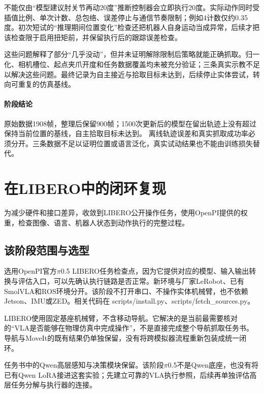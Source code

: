 不能仅由``模型建议肘关节再动20度''推断控制器会立即执行20度。实际动作同时受插值比例、单次计数、总包络、误差停止与通信节奏限制；例如4计数仅约0.35度。初次短试的``推理期间位置变化''检查还把机器人自身运动当成异常，后续才把该检查限于启用扭矩前，并保留执行后的跟踪误差检查。

这些问题解释了部分``几乎没动''，但并未证明解除限制后策略就能正确抓取。归一化、相机槽位、起点夹爪开度和任务数据覆盖均未被充分验证；三条真实示教不足以解决这些问题。最终记录为自主接近与拾取目标未达到，后续停止实体尝试，转向可重复的仿真基线。


\paragraph{阶段结论}原始数据1908帧，整理后保留900帧；1500次更新后的模型在留出轨迹上没有超过保持当前位置的基线，自主拾取目标未达到。 离线轨迹误差和真实抓取成功率必须分开。三条数据不足以证明位置或语言泛化，真实试动结果也不能由训练损失替代。


\FloatBarrier

\section{\pifive{}在LIBERO中的闭环复现}

\label{stage:s08}

为减少硬件和接口差异，收敛到LIBERO公开操作任务，使用OpenPI提供的\pifive{}权重，检查图像、语言、机器人状态到动作执行的完整过程。

\subsection{该阶段范围与选型}\label{s08-detail-1}

选用OpenPI官方\(\pi\)0.5 LIBERO任务检查点，因为它提供对应的模型、输入输出转换与评估入口，可以先确认执行链路是否正常。新环境与厂家LeRobot、已有SmolVLA和ROS环境分开。该阶段不打开串口、不操作实体机械臂，也不依赖Jetson、IMU或ZED。相关代码在 scripts/install.py、scripts/fetch\_sources.py。

LIBERO使用固定基座机械臂，不含移动导航。它解决的是当前最需要核对的``VLA是否能够在物理仿真中完成操作''，不是直接完成整个导航抓取任务书。导航与MoveIt的既有结果仍单独保留，没有将跨模拟器流程重新包装成统一闭环。

任务书中的Qwen高层感知与决策模块保留。该阶段\(\pi\)0.5不是Qwen底座，也没有将已有Qwen LoRA接进这套实验；先建立可靠的VLA执行参照，后续再单独评估高层任务分解与执行器的连接。

